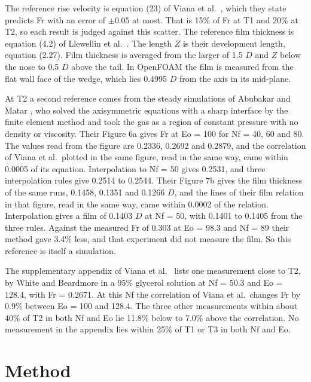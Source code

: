 \documentclass[11pt,a4paper]{article}
\begin{document}
The reference rise velocity is equation (23) of Viana et al.\ \cite{viana2003universal}, which they state predicts Fr with an error of $\pm 0.05$ at most. That is 15\% of Fr at T1 and 20\% at T2, so each result is judged against this scatter. The reference film thickness is equation (4.2) of Llewellin et al.\ \cite{llewellin2012thickness}. The length $Z$ is their development length, equation (2.27). Film thickness is averaged from the larger of 1.5 $D$ and $Z$ below the nose to 0.5 $D$ above the tail. In OpenFOAM the film is measured from the flat wall face of the wedge, which lies 0.4995 $D$ from the axis in its mid-plane.

At T2 a second reference comes from the steady simulations of Abubakar and Matar \cite{abubakar2021taylor}, who solved the axisymmetric equations with a sharp interface by the finite element method and took the gas as a region of constant pressure with no density or viscosity. Their Figure 6a gives Fr at Eo = 100 for Nf = 40, 60 and 80. The values read from the figure are 0.2336, 0.2692 and 0.2879, and the correlation of Viana et al.\ plotted in the same figure, read in the same way, came within 0.0005 of its equation. Interpolation to Nf = 50 gives 0.2531, and three interpolation rules give 0.2514 to 0.2544. Their Figure 7b gives the film thickness of the same runs, 0.1458, 0.1351 and 0.1266 $D$, and the lines of their film relation in that figure, read in the same way, came within 0.0002 of the relation. Interpolation gives a film of 0.1403 $D$ at Nf = 50, with 0.1401 to 0.1405 from the three rules. Against the measured Fr of 0.303 at Eo = 98.3 and Nf = 89 \cite{bugg2002velocity} their method gave 3.4\% less, and that experiment did not measure the film. So this reference is itself a simulation.

The supplementary appendix of Viana et al.\ \cite{viana2003universal} lists one measurement close to T2, by White and Beardmore in a 95\% glycerol solution at Nf = 50.3 and Eo = 128.4, with Fr = 0.2671. At this Nf the correlation of Viana et al.\ changes Fr by 0.9\% between Eo = 100 and 128.4. The three other measurements within about 40\% of T2 in both Nf and Eo lie 11.8\% below to 7.0\% above the correlation. No measurement in the appendix lies within 25\% of T1 or T3 in both Nf and Eo.

\section{Method}
\label{sec:method}
\end{document}

